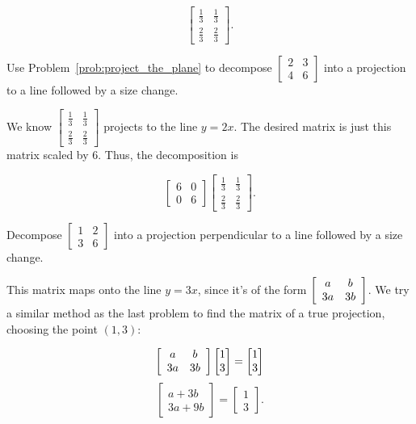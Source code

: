 \documentclass[../key.tex]{subfiles}
\begin{document}
$$\begin{bmatrix}
\frac{1}{3} & \frac{1}{3} \\
\frac{2}{3} & \frac{2}{3}
\end{bmatrix}.$$

\begin{outer_problem}
\item Use Problem~\ref{prob:project_the_plane} to decompose $\left[\begin{smallmatrix} 2 & 3 \\ 4 & 6 \end{smallmatrix}\right]$ into a projection to a line followed by a size change.
\end{outer_problem}

We know $\begin{bmatrix}
\frac{1}{3} & \frac{1}{3} \\
\frac{2}{3} & \frac{2}{3}
\end{bmatrix}$ projects to the line $y=2x$. The desired matrix is just this matrix scaled by $6$. Thus, the decomposition is

$$\begin{bmatrix}6 & 0 \\ 0 & 6 \end{bmatrix} \begin{bmatrix}
\frac{1}{3} & \frac{1}{3} \\
\frac{2}{3} & \frac{2}{3}
\end{bmatrix}.$$

\begin{outer_problem}
\item Decompose $\left[\begin{smallmatrix} 1 & 2 \\ 3 & 6\end{smallmatrix}\right]$ into a projection perpendicular to a line followed by a size change.
\end{outer_problem}

This matrix maps onto the line $y=3x$, since it's of the form $\left[\begin{array}{cc} a & b \\ 3a & 3b \end{array}\right]$. We try a similar method as the last problem to find the matrix of a true projection, choosing the point $(1,3)$:

$$\left[\begin{array}{cc} a & b \\ 3a & 3b \end{array}\right]\begin{bmatrix} 1 \\ 3 \end{bmatrix} = \begin{bmatrix} 1 \\ 3 \end{bmatrix}$$
$$\begin{bmatrix} a + 3b \\ 3a + 9b \end{bmatrix} = \begin{bmatrix} 1 \\ 3 \end{bmatrix}.$$
\end{document}
